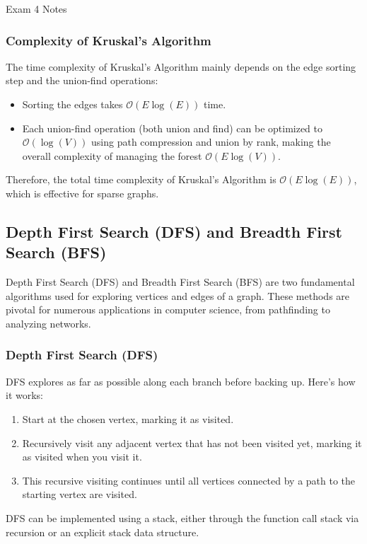 \begin{examnotes}{Exam 4 Notes}
    \subsubsection*{Complexity of Kruskal's Algorithm}
    
    The time complexity of Kruskal's Algorithm mainly depends on the edge sorting step and the union-find operations:
    \begin{itemize}
        \item Sorting the edges takes $\mathcal{O}(E\log{(E)})$ time.
        \item Each union-find operation (both union and find) can be optimized to $\mathcal{O}(\log{(V)})$ using path compression and union by rank, making the overall complexity of managing the forest 
        $\mathcal{O}(E\log{(V)})$.
    \end{itemize}
    Therefore, the total time complexity of Kruskal's Algorithm is $\mathcal{O}(E\log{(E)})$, which is effective for sparse graphs.

    \subsection*{Depth First Search (DFS) and Breadth First Search (BFS)}

    Depth First Search (DFS) and Breadth First Search (BFS) are two fundamental algorithms used for exploring vertices and edges of a graph. These methods are pivotal for numerous applications in computer 
    science, from pathfinding to analyzing networks.
    
    \subsubsection*{Depth First Search (DFS)}
    
    DFS explores as far as possible along each branch before backing up. Here's how it works:
    \begin{enumerate}
        \item Start at the chosen vertex, marking it as visited.
        \item Recursively visit any adjacent vertex that has not been visited yet, marking it as visited when you visit it.
        \item This recursive visiting continues until all vertices connected by a path to the starting vertex are visited.
    \end{enumerate}
    DFS can be implemented using a stack, either through the function call stack via recursion or an explicit stack data structure.
    

\end{examnotes}
